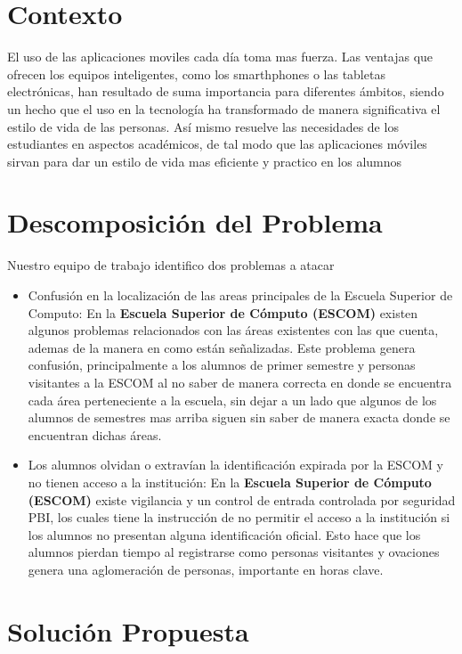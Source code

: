 
\label{ch:Antecedentes}
\section{Contexto}
El uso de las aplicaciones moviles cada día toma mas fuerza. Las ventajas que ofrecen los equipos inteligentes, como los smarthphones o las tabletas electrónicas, han resultado de suma importancia para diferentes ámbitos, siendo un hecho que el uso en la tecnología ha transformado de manera significativa el estilo de vida de las personas.
Así mismo resuelve las necesidades de los estudiantes en aspectos académicos, de tal modo que las aplicaciones móviles sirvan para dar un estilo de vida mas eficiente y practico en los alumnos

\section{Descomposición del Problema}
Nuestro equipo de trabajo identifico dos problemas a atacar
\begin{itemize}
	
	\item Confusión en la localización de las areas principales de la Escuela Superior de Computo: En la \textbf{Escuela Superior de Cómputo (ESCOM)} existen algunos problemas relacionados con las áreas existentes con las que cuenta, ademas de la manera en como están señalizadas.
	Este problema genera confusión, principalmente a los alumnos de primer semestre y personas visitantes a la ESCOM al no saber de manera correcta en donde se encuentra cada área perteneciente a la escuela, sin dejar a un lado que algunos de los alumnos de semestres mas arriba siguen sin saber de manera exacta donde se encuentran dichas áreas. 
	
	\item Los alumnos olvidan o extravían la identificación expirada por la ESCOM y no tienen acceso a la institución: En la \textbf{Escuela Superior de Cómputo (ESCOM)} existe vigilancia y un control de entrada controlada por seguridad PBI, los cuales tiene la instrucción de no permitir el acceso a la institución si los alumnos no presentan alguna identificación oficial.
	Esto hace que los alumnos pierdan tiempo al registrarse como personas visitantes y ovaciones genera una aglomeración de personas, importante en horas clave.
	
	
\end{itemize}

\section{Solución Propuesta}

